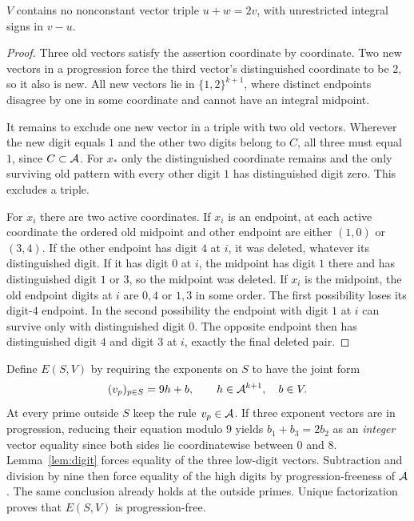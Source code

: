 \begin{lemma}\label{lem:digit}
$V$ contains no nonconstant vector triple $u+w=2v$, with unrestricted integral signs in $v-u$.
\end{lemma}
\begin{proof}
Three old vectors satisfy the assertion coordinate by coordinate. Two new vectors in a progression force the third vector's distinguished coordinate to be $2$, so it also is new. All new vectors lie in $\{1,2\}^{k+1}$, where distinct endpoints disagree by one in some coordinate and cannot have an integral midpoint.

It remains to exclude one new vector in a triple with two old vectors. Wherever the new digit equals $1$ and the other two digits belong to $C$, all three must equal $1$, since $C\subset\mathcal A$. For $x_*$ only the distinguished coordinate remains and the only surviving old pattern with every other digit $1$ has distinguished digit zero. This excludes a triple.

For $x_i$ there are two active coordinates. If $x_i$ is an endpoint, at each active coordinate the ordered old midpoint and other endpoint are either $(1,0)$ or $(3,4)$. If the other endpoint has digit $4$ at $i$, it was deleted, whatever its distinguished digit. If it has digit $0$ at $i$, the midpoint has digit $1$ there and has distinguished digit $1$ or $3$, so the midpoint was deleted. If $x_i$ is the midpoint, the old endpoint digits at $i$ are $0,4$ or $1,3$ in some order. The first possibility loses its digit-$4$ endpoint. In the second possibility the endpoint with digit $1$ at $i$ can survive only with distinguished digit $0$. The opposite endpoint then has distinguished digit $4$ and digit $3$ at $i$, exactly the final deleted pair.
\end{proof}

Define $E(S,V)$ by requiring the exponents on $S$ to have the joint form
\[
       (v_p)_{p\in S}=9h+b,\qquad h\in\mathcal A^{k+1},\quad b\in V .
\]
At every prime outside $S$ keep the rule $v_p\in\mathcal A$. If three exponent vectors are in progression, reducing their equation modulo $9$ yields $b_1+b_3=2b_2$ as an \emph{integer} vector equality since both sides lie coordinatewise between $0$ and $8$. Lemma~\ref{lem:digit} forces equality of the three low-digit vectors. Subtraction and division by nine then force equality of the high digits by progression-freeness of $\mathcal A$. The same conclusion already holds at the outside primes. Unique factorization proves that $E(S,V)$ is progression-free.

